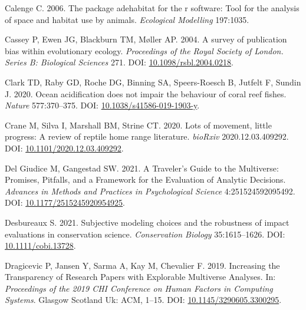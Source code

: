 \documentclass[10pt,a4paper]{article}
\newlength{\cslhangindent}
\newlength{\cslentryspacingunit} %
\newenvironment{CSLReferences}[2] %
 {%
  \setlength{\parindent}{0pt}
  \ifodd #1
  \let\oldpar\par
  \def\par{\hangindent=\cslhangindent\oldpar}
  \fi
  \setlength{\parskip}{#2\cslentryspacingunit}
 }%
 {}
\begin{document}
\begin{CSLReferences}{1}{0}
\leavevmode{}%
Calenge C. 2006. The package adehabitat for the r software: Tool for the analysis of space and habitat use by animals. \emph{Ecological Modelling} 197:1035.

\leavevmode{}%
Cassey P, Ewen JG, Blackburn TM, Møller AP. 2004. A survey of publication bias within evolutionary ecology. \emph{Proceedings of the Royal Society of London. Series B: Biological Sciences} 271. DOI: \href{https://doi.org/10.1098/rsbl.2004.0218}{10.1098/rsbl.2004.0218}.

\leavevmode{}%
Clark TD, Raby GD, Roche DG, Binning SA, Speers-Roesch B, Jutfelt F, Sundin J. 2020. Ocean acidification does not impair the behaviour of coral reef fishes. \emph{Nature} 577:370--375. DOI: \href{https://doi.org/10.1038/s41586-019-1903-y}{10.1038/s41586-019-1903-y}.

\leavevmode{}%
Crane M, Silva I, Marshall BM, Strine CT. 2020. Lots of movement, little progress: {A} review of reptile home range literature. \emph{bioRxiv} 2020.12.03.409292. DOI: \href{https://doi.org/10.1101/2020.12.03.409292}{10.1101/2020.12.03.409292}.

\leavevmode{}%
Del Giudice M, Gangestad SW. 2021. A {Traveler}'s {Guide} to the {Multiverse}: {Promises}, {Pitfalls}, and a {Framework} for the {Evaluation} of {Analytic} {Decisions}. \emph{Advances in Methods and Practices in Psychological Science} 4:251524592095492. DOI: \href{https://doi.org/10.1177/2515245920954925}{10.1177/2515245920954925}.

\leavevmode{}%
Desbureaux S. 2021. Subjective modeling choices and the robustness of impact evaluations in conservation science. \emph{Conservation Biology} 35:1615--1626. DOI: \href{https://doi.org/10.1111/cobi.13728}{10.1111/cobi.13728}.

\leavevmode{}%
Dragicevic P, Jansen Y, Sarma A, Kay M, Chevalier F. 2019. Increasing the {Transparency} of {Research} {Papers} with {Explorable} {Multiverse} {Analyses}. In: \emph{Proceedings of the 2019 {CHI} {Conference} on {Human} {Factors} in {Computing} {Systems}}. Glasgow Scotland Uk: ACM, 1--15. DOI: \href{https://doi.org/10.1145/3290605.3300295}{10.1145/3290605.3300295}.


\end{CSLReferences}
\end{document}
